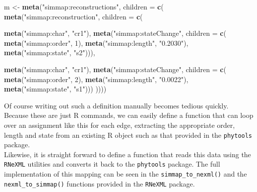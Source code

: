 \documentclass[author-year, review, 11pt]{components/elsarticle} %
\newenvironment{Shaded}{\begin{snugshade}}{\end{snugshade}}
\newcommand{\KeywordTok}[1]{\textcolor[rgb]{0.13,0.29,0.53}{\textbf{{#1}}}}
\newcommand{\DataTypeTok}[1]{\textcolor[rgb]{0.13,0.29,0.53}{{#1}}}
\newcommand{\DecValTok}[1]{\textcolor[rgb]{0.00,0.00,0.81}{{#1}}}
\newcommand{\StringTok}[1]{\textcolor[rgb]{0.31,0.60,0.02}{{#1}}}
\newcommand{\NormalTok}[1]{{#1}}
\begin{document}
\begin{Shaded}
\begin{Highlighting}[]
 \NormalTok{m <-}\StringTok{ }\KeywordTok{meta}\NormalTok{(}\StringTok{"simmap:reconstructions"}\NormalTok{, }\DataTypeTok{children =} \KeywordTok{c}\NormalTok{(}
        \KeywordTok{meta}\NormalTok{(}\StringTok{"simmap:reconstruction"}\NormalTok{, }\DataTypeTok{children =} \KeywordTok{c}\NormalTok{(}

          \KeywordTok{meta}\NormalTok{(}\StringTok{"simmap:char"}\NormalTok{, }\StringTok{"cr1"}\NormalTok{),}
          \KeywordTok{meta}\NormalTok{(}\StringTok{"simmap:stateChange"}\NormalTok{, }\DataTypeTok{children =} \KeywordTok{c}\NormalTok{(}
            \KeywordTok{meta}\NormalTok{(}\StringTok{"simmap:order"}\NormalTok{, }\DecValTok{1}\NormalTok{),}
            \KeywordTok{meta}\NormalTok{(}\StringTok{"simmap:length"}\NormalTok{, }\StringTok{"0.2030"}\NormalTok{),}
            \KeywordTok{meta}\NormalTok{(}\StringTok{"simmap:state"}\NormalTok{, }\StringTok{"s2"}\NormalTok{))),}
          
          \KeywordTok{meta}\NormalTok{(}\StringTok{"simmap:char"}\NormalTok{, }\StringTok{"cr1"}\NormalTok{),}
          \KeywordTok{meta}\NormalTok{(}\StringTok{"simmap:stateChange"}\NormalTok{, }\DataTypeTok{children =} \KeywordTok{c}\NormalTok{(}
            \KeywordTok{meta}\NormalTok{(}\StringTok{"simmap:order"}\NormalTok{, }\DecValTok{2}\NormalTok{),}
            \KeywordTok{meta}\NormalTok{(}\StringTok{"simmap:length"}\NormalTok{, }\StringTok{"0.0022"}\NormalTok{),}
            \KeywordTok{meta}\NormalTok{(}\StringTok{"simmap:state"}\NormalTok{, }\StringTok{"s1"}\NormalTok{)))}
          \NormalTok{))))}
\end{Highlighting}
\end{Shaded}

Of course writing out such a definition manually becomes tedious
quickly. Because these are just R commands, we can easily define a
function that can loop over an assignment like this for each edge,
extracting the appropriate order, length and state from an existing R
object such as that provided in the \texttt{phytools}
package.\\Likewise, it is straight forward to define a function that
reads this data using the \texttt{RNeXML} utilities and converts it back
to the \texttt{phytools} package. The full implementation of this
mapping can be seen in the \texttt{simmap\_to\_nexml()} and the
\texttt{nexml\_to\_simmap()} functions provided in the \texttt{RNeXML}
package.
\end{document}
